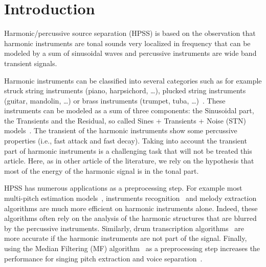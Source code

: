 \section{Introduction}
\label{sec:intro}


Harmonic/percussive source separation (HPSS) is based on the observation that harmonic instruments are tonal sounds very localized in frequency that can be modeled by a sum of sinusoidal waves and percussive instruments are wide band transient signals.

Harmonic instruments can be classified into several categories such as for example struck string instruments (piano, harpsichord, \ldots), plucked string instruments (guitar, mandolin, \ldots) or brass instruments (trumpet, tuba, \ldots)~\cite{peeters2003automatic}. These instruments can be modeled as a sum of three components: the Sinusoidal part, the Transients and the Residual, so called  Sines + Transients + Noise (STN) models~\cite{daudet2006review}. The transient of the harmonic instruments show some percussive properties (i.e., fast attack and fast decay). Taking into account the transient part of harmonic instruments is a challenging task that will not be treated this article. Here, as in other article of the literature, we rely on the hypothesis that most of the energy of the harmonic signal is in the tonal part. 


HPSS has numerous applications as a preprocessing step. For example most multi-pitch estimation models~\cite{klapuri2008multipitch}, instruments recognition~\cite{eronen2000musical} and melody extraction~\cite{salamon2012melody,rigaudISMIR2016} algorithms are much more efficient on harmonic instruments alone. Indeed, these algorithms often rely on the analysis of the harmonic structures that are blurred by the percussive instruments. Similarly, drum transcription algorithms~\cite{paulus2005drum,wudrum2016} are more accurate if the harmonic instruments are not part of the signal. Finally, using the Median Filtering (MF) algorithm~\cite{fitzgerald2010harmonic} as a preprocessing step increases the performance for singing pitch extraction and voice separation~\cite{hsu2012tandem}. 


